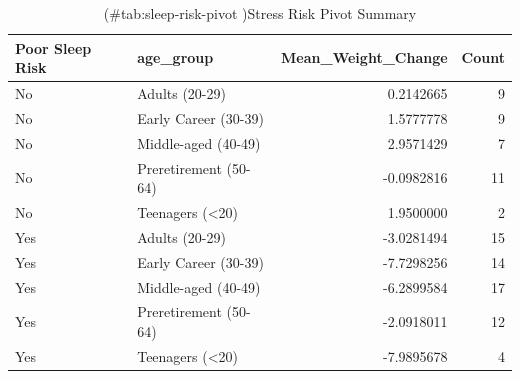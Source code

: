 \documentclass[
  man,floatsintext]{apa6}
\begin{document}
\begin{table}

\caption{(\#tab:sleep-risk-pivot )Stress Risk Pivot Summary}
\centering
\begin{tabular}[t]{l|l|r|r}
\hline
Poor Sleep Risk & age\_group & Mean\_Weight\_Change & Count\\
\hline
No & Adults (20-29) & 0.2142665 & 9\\
\hline
No & Early Career (30-39) & 1.5777778 & 9\\
\hline
No & Middle-aged (40-49) & 2.9571429 & 7\\
\hline
No & Preretirement (50-64) & -0.0982816 & 11\\
\hline
No & Teenagers (<20) & 1.9500000 & 2\\
\hline
Yes & Adults (20-29) & -3.0281494 & 15\\
\hline
Yes & Early Career (30-39) & -7.7298256 & 14\\
\hline
Yes & Middle-aged (40-49) & -6.2899584 & 17\\
\hline
Yes & Preretirement (50-64) & -2.0918011 & 12\\
\hline
Yes & Teenagers (<20) & -7.9895678 & 4\\
\hline
\end{tabular}
\end{table}

\newpage
\end{document}
